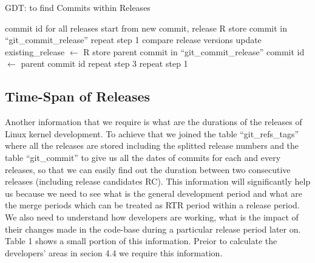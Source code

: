 \documentclass{acm_proc_article-sp}
\begin{document}
\begin{algorithm}
\caption{GDT: to find Commits within Releases}
\begin{algorithmic}[1]
\REQUIRE
\STATE commit id for all releases
\ENSURE
{}
\STATE start from new commit, release R
\STATE store commit in ``git\_commit\_release''
			\STATE repeat step 1
			\STATE compare release versions
				\STATE update existing\_release $\gets$ R
			\ENDIF
		\ELSE
			\STATE store parent commit in ``git\_commit\_release''
			\STATE commit id $\gets$ parent commit id
			\STATE repeat step 3
		\ENDIF
	\ENDFOR
{}
	\STATE repeat step 1
\ENDIF
\ENDFOR
\end{algorithmic}
\end{algorithm}

\subsection{Time-Span of Releases}
Another information that we require is what are the durations of the releases of Linux kernel development. To achieve that we joined the table ``git\_refs\_tags'' where all the releases are stored including the splitted release numbers and the table ``git\_commit'' to give us all the dates of commits for each and every releases, so that we can easily find out the duration between two consecutive releases (including release candidates RC). This information will significantly help us because we need to see what is the general development period and what are the merge periods which can be treated as RTR period within a release period. We also need to understand how developers are working, what is the impact of their changes made in the code-base during a particular release period later on. Table 1 shows a small portion of this information. Preior to calculate the developers' areas in secion 4.4 we require this information.
\end{document}
